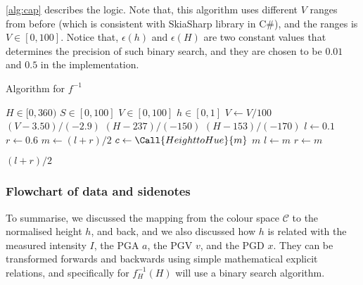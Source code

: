 \autoref{alg:cap} describes the logic. Note that, this algorithm uses different \(V\) ranges from before (which is consistent with SkiaSharp library in C\#), and the ranges is \(V \in [0, 100]\). Notice that, \(\epsilon(h)\) and \(\epsilon(H)\) are two constant values that determines the precision of such binary search, and they are chosen to be \(0.01\) and \(0.5\) in the implementation.

\begin{algorithm}[htp]
    \caption{Algorithm for \(f^{-1}\)}\label{alg:cap}
    \begin{algorithmic}
        \Require \(H \in [0, 360)\)
        \Require \(S \in [0, 100]\)
        \Require \(V \in [0, 100]\)
        \Ensure \(h \in [0, 1]\)
        \State \(V \gets V / 100\) 
         
        \State \Return \((V - 3.50) / (-2.9)\)
        \Else {}
        \State \Return \((H - 237) / (-150)\)
        \State \Return \((H - 153) / (-170)\)
        \Else
        \State \(l \gets 0.1\)
        \State \(r \gets 0.6\)
        \State \(m \gets (l + r) / 2\)
        \State \(c \gets \Call{Height to Hue}{m}\)
        \State \Return \(m\)
        \State \(l \gets m\)
        \State \(r \gets m\)
        \EndIf
        \EndWhile

        \State \Return \((l + r) / 2\)
        \EndIf
        \EndIf
    \end{algorithmic}
\end{algorithm}

\subsubsection{Flowchart of data and sidenotes}

To summarise, we discussed the mapping from the colour space \(\mathcal{C}\) to the normalised height \(h\), and back, and we also discussed how \(h\) is related with the measured intensity \(I\), the PGA \(a\), the PGV \(v\), and the PGD \(x\). They can be transformed forwards and backwards using simple mathematical explicit relations, and specifically for \(f_H^{-1}(H)\) will use a binary search algorithm.

